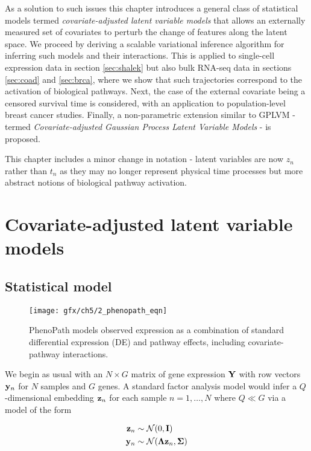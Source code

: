 As a solution to such issues this chapter introduces a general class of statistical models termed \emph{covariate-adjusted latent variable models} that allows an externally measured set of covariates to perturb the change of features along the latent space. We proceed by deriving a scalable variational inference algorithm for inferring such models and their interactions. This is applied to single-cell expression data in section \ref{sec:shalek} but also bulk RNA-seq data in sections \ref{sec:coad} and \ref{sec:brca}, where we show that such trajectories correspond to the activation of biological pathways. Next, the case of the external covariate being a censored survival time is considered, with an application to population-level breast cancer studies. Finally, a non-parametric extension similar to GPLVM - termed \emph{Covariate-adjusted Gaussian Process Latent Variable Models} - is proposed.

This chapter includes a minor change in notation - latent variables are now $z_n$ rather than $t_n$ as they may no longer represent physical time processes but more abstract notions of biological pathway activation.

\section{Covariate-adjusted latent variable models}

\subsection{Statistical model}

\begin{figure}
\centering
  \texttt{[image: gfx/ch5/2\_phenopath\_eqn]}
  \caption{PhenoPath models observed expression as a combination of standard differential expression (DE) and pathway effects, including covariate-pathway interactions.
  } \label{fig:phenopath_eqn}
\end{figure}

We begin as usual with an $N \times G$ matrix of gene expression $\mathbf{Y}$ with row vectors $\mathbf{y}_n$ for $N$ samples and $G$ genes. A standard factor analysis model would infer a $Q$-dimensional embedding $\mathbf{z}_n$ for each sample $n = 1, \ldots, N$ where $Q \ll G$ via a model of the form

\begin{equation}
  \begin{aligned}
\mathbf{z}_n & \sim \mathcal{N}(0, \mathbf{I}) \\
\mathbf{y}_n & \sim \mathcal{N}(\bm{\Lambda} \mathbf{z}_n, \bm{\Sigma})
  \end{aligned}
\end{equation}

